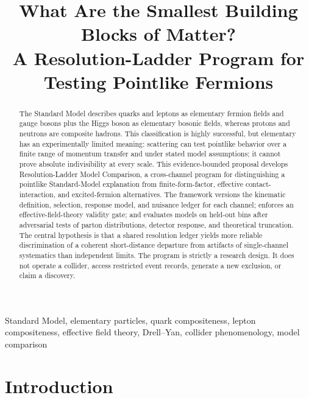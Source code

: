 \documentclass[conference]{../../../../Conference-LaTeX-template_10-17-19/IEEEtran}
\begin{document}
\title{What Are the Smallest Building Blocks of Matter?\\
\large A Resolution-Ladder Program for Testing Pointlike Fermions}
\author{}
\maketitle

\begin{abstract}
The Standard Model describes quarks and leptons as elementary fermion fields and gauge bosons plus the Higgs boson as elementary bosonic fields, whereas protons and neutrons are composite hadrons. This classification is highly successful, but elementary has an experimentally limited meaning: scattering can test pointlike behavior over a finite range of momentum transfer and under stated model assumptions; it cannot prove absolute indivisibility at every scale. This evidence-bounded proposal develops Resolution-Ladder Model Comparison, a cross-channel program for distinguishing a pointlike Standard-Model explanation from finite-form-factor, effective contact-interaction, and excited-fermion alternatives. The framework versions the kinematic definition, selection, response model, and nuisance ledger for each channel; enforces an effective-field-theory validity gate; and evaluates models on held-out bins after adversarial tests of parton distributions, detector response, and theoretical truncation. The central hypothesis is that a shared resolution ledger yields more reliable discrimination of a coherent short-distance departure from artifacts of single-channel systematics than independent limits. The program is strictly a research design. It does not operate a collider, access restricted event records, generate a new exclusion, or claim a discovery.
\end{abstract}

\begin{IEEEkeywords}
Standard Model, elementary particles, quark compositeness, lepton compositeness, effective field theory, Drell--Yan, collider phenomenology, model comparison
\end{IEEEkeywords}

\section{Introduction}
\end{document}
